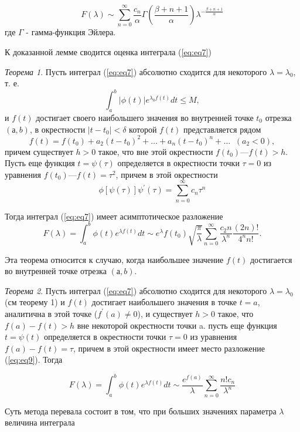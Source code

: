 \documentclass[14pt]{extarticle}
\begin{document}
\begin{equation}\label{eq:eq8}
F(\lambda) \sim \sum_{n=0}^{\infty}\frac{c_n}{\alpha} \Gamma\left(\frac{\beta + n + 1}{\alpha}\right)\lambda^{-\frac{\beta + n + 1}{\alpha}}
\end{equation} 
где $\Gamma$ - гамма-функция Эйлера.

К доказанной лемме сводится оценка интеграла (\ref{eq:eq7})

\textit{Теорема 1\label{th:th1}}. Пусть интеграл (\ref{eq:eq7}) абсолютно сходится для некоторого $\lambda = \lambda_0$, т. е.
$$
\int_{a}^{b} |\phi(t)|e^{\lambda_0 f(t)}dt \le M,
$$
и $f(t)$ достигает своего наибольшего значения во внутренней точке $t_0$ отрезка $(а, b)$, в окрестности $| t - t_0| < \delta$ которой $f(t)$ представляется рядом
$$
f(t)=f(t_0) + a_2(t-t_0)^2+\dots+a_n(t-t_0)^n+\dots \;\; (a_2<0),
$$
причем существует $h > 0$ такое, что вне этой окрестности $f (t_0) — f(t) > h$. Пусть еще функция $t = \psi(\tau)$ определяется в окрестности точки $\tau = 0$ из уравнения $f(t_0) — f(t) = \tau^2$, причем в этой окрестности
\begin{equation}\label{eq:eq9}
\phi[\psi(\tau)]\psi^\prime(\tau) = \sum_{n=0}^{\infty} c_n\tau^n
\end{equation}

Тогда интеграл (\ref{eq:eq7}) имеет асимптотическое разложение
$$
F(\lambda)=\int_{a}^{b}\phi(t)e^{\lambda f(t)}dt \sim e^\lambda f(t_0) \sqrt{\frac{\pi}{\lambda}} \sum_{n=0}^{\infty}\frac{c_2n}{\lambda^n}\frac{(2n)!}{4^n n!}.
$$

Эта теорема относится к случаю, когда наибольшее значение $f(t)$ достигается во внутренней точке отрезка $(а, b)$. 

\textit{Теорема 2\label{th:th2}}. Пусть интеграл (\ref{eq:eq7}) абсолютно сходится для некоторого $\lambda = \lambda_0$ (см теорему 1) и $f(t)$ достигает наибольшего значения в точке $t=a$, аналитична в этой точке ($f^\prime(a) \neq 0$), и существует $h>0$ такое, что $f(a)-f(t)>h$ вне некоторой окрестности точки a. пусть еще функция $t=\psi(t)$ определяется в окрестности точки $\tau=0$ из уравнения $f(a) - f(t) = \tau$, причем в этой окрестности имеет место разложение (\ref{eq:eq9}). Тогда

\begin{equation}\label{eq:eq10}
F(\lambda) = \int_{a}^{b}\phi(t)e^{\lambda f(t)}dt \sim \frac{e^{f(a)}}{\lambda}\sum_{n=0}^{\infty}\frac{n! c_n}{\lambda^n}
\end{equation}

Суть метода перевала состоит в том, что при больших значениях параметра $\lambda$ величина интеграла
\end{document}
